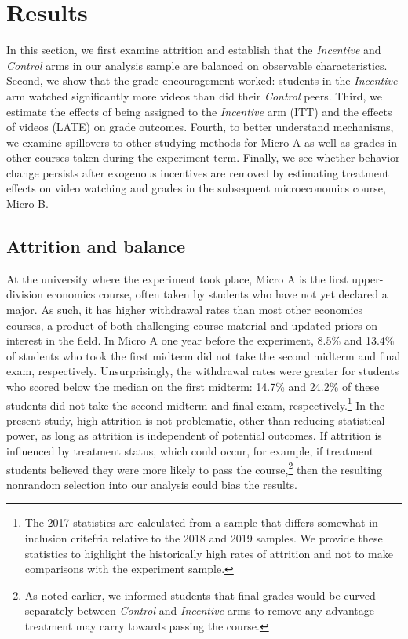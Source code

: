 \documentclass[12pt]{article}
\begin{document}



\section{Results} \label{results}

In this section, we first examine attrition and establish that the \textit{Incentive} and \textit{Control} arms in our analysis sample are balanced on observable characteristics. Second, we show that the grade encouragement worked: students in the \textit{Incentive} arm watched significantly more videos than did their \textit{Control} peers. Third, we estimate the effects of being assigned to the \textit{Incentive} arm (ITT) and the effects of videos (LATE) on grade outcomes. Fourth, to better understand mechanisms, we examine spillovers to other studying methods for Micro A as well as grades in other courses taken during the experiment term. Finally, we see whether behavior change persists after exogenous incentives are removed by estimating treatment effects on video watching and grades in the subsequent microeconomics course, Micro B.

\subsection{Attrition and balance} \label{attrition}

At the university where the experiment took place, Micro A is the first upper-division economics course, often taken by students who have not yet declared a major. As such, it has higher withdrawal rates than most other economics courses, a product of both challenging course material and updated priors on interest in the field. In Micro A one year before the experiment, 8.5\% and 13.4\% of students who took the first midterm did not take the second midterm and final exam, respectively. Unsurprisingly, the withdrawal rates were greater for students who scored below the median on the first midterm: 14.7\% and 24.2\% of these students did not take the second midterm and final exam, respectively.\footnote{The 2017 statistics are calculated from a sample that differs somewhat in inclusion critefria relative to the 2018 and 2019 samples. We provide these statistics to highlight the historically high rates of attrition and not to make comparisons with the experiment sample.} In the present study, high attrition is not problematic, other than reducing statistical power, as long as attrition is independent of potential outcomes. If attrition is influenced by treatment status, which could occur, for example, if treatment students believed they were more likely to pass the course,\footnote{As noted earlier, we informed students that final grades would be curved separately between \textit{Control} and \textit{Incentive} arms to remove any advantage treatment may carry towards passing the course.} then the resulting nonrandom selection into our analysis could bias the results.
\end{document}
